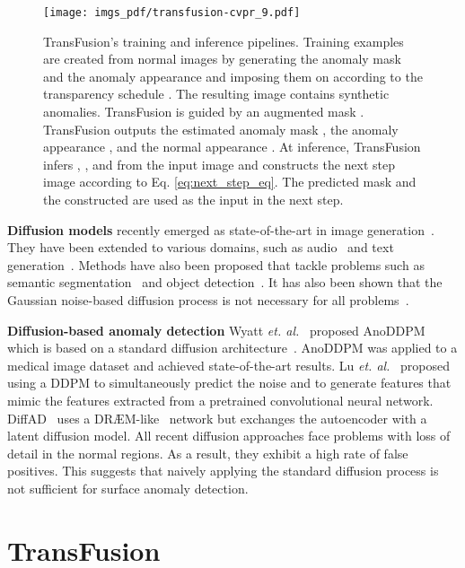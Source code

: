 \documentclass[10pt,twocolumn,letterpaper]{article}
\begin{document}
\begin{figure*}[t]
    \centering
    \texttt{[image: imgs\_pdf/transfusion-cvpr\_9.pdf]}
    \caption{
    TransFusion's \textcolor{trainorange}{training} and \textcolor{inferblue}{inference} pipelines. \textcolor{trainorange}{Training} examples are created from normal images  by generating the anomaly mask  and the anomaly appearance  and imposing them on  according to the transparency schedule . The resulting image  contains synthetic anomalies. TransFusion is guided by an augmented mask . TransFusion outputs the estimated anomaly mask , the anomaly appearance , and the normal appearance . At \textcolor{inferblue}{inference}, TransFusion infers , , and  from the input image and constructs the next step image according to Eq. \ref{eq:next_step_eq}. The predicted mask  and the constructed  are used as the input in the next step.}

    \label{fig:transfusion}
\end{figure*}

\noindent\textbf{Diffusion models} recently emerged as state-of-the-art in image generation~\cite{ddpm}. They have been extended to various domains, such as audio~\cite{diffusion-audio, diffusion-speech} and text generation~\cite{diffusion-text, diffusion-multinomial-text}. Methods have also been proposed that tackle problems such as semantic segmentation~\cite{segdiff, medsegdiff} and object detection~\cite{diffusiondet}. It has also been shown that the Gaussian noise-based diffusion process is not necessary for all problems~\cite{cold-diffusion, diffusiondet}.


\noindent\textbf{Diffusion-based anomaly detection} Wyatt \textit{et. al.}~\cite{AnnoDDPM} proposed AnoDDPM which is based on a standard diffusion architecture~\cite{ddpm}. AnoDDPM was applied to a medical image dataset and achieved state-of-the-art results. Lu \textit{et. al.}~\cite{ddpm-noise-anomaly} proposed using a DDPM to simultaneously predict the noise and to generate features that mimic the features extracted from a pretrained convolutional neural network. DiffAD~\cite{ldm_draem} uses a DR{\AE}M-like~\cite{draem} network but exchanges the autoencoder with a latent diffusion model. All recent diffusion approaches face problems with loss of detail in the normal regions. As a result, they exhibit a high rate of false positives. This suggests that naively applying the standard diffusion process is not sufficient for surface anomaly detection.


\section{TransFusion}
\end{document}
